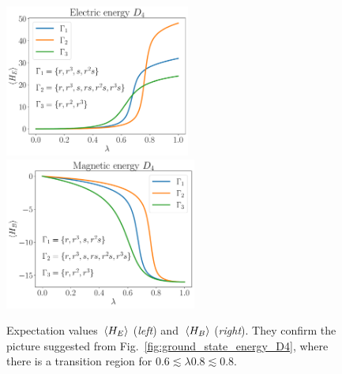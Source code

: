 \begin{figure}[h]
    \centering
    \includegraphics[height=5cm]{assets/graphs/gs_elec_comparison_1_2_3.pdf}%
    \hfill%
    \includegraphics[height=5cm]{assets/graphs/gs_magn_comparison_1_2_3.pdf}
    \caption[Electric and magnetic energies for $D_4$]{%
        Expectation values $\ev*{H_E}$ (\emph{left}) and $\ev*{H_B}$ (\emph{right}).
        They confirm the picture suggested from Fig.~\ref{fig:ground_state_energy_D4}, where there is a transition region for $ 0.6 \lesssim \lambda 0.8 \lesssim 0.8$.
    }
    \label{fig:HE_HB_expt_val_D4}
\end{figure}

\vspace*{0.5cm}

